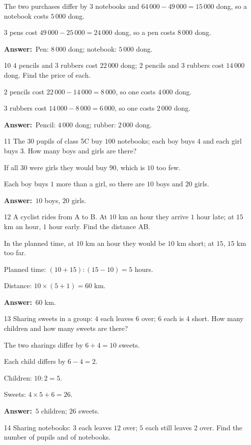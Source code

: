 \documentclass[11pt]{article}
\newif\ifsol \solfalse
\providecommand{\AnsWord}{Đáp số}
\newcommand{\dapso}[1]{\par\textbf{\AnsWord:}\ #1}
\newcommand{\probsol}[1]{%
  \begin{lrbox}{\solmeasure}\begin{minipage}{\dimexpr\linewidth-24pt\relax}#1\end{minipage}\end{lrbox}%
  \ifsol
    \begin{solbox}#1\end{solbox}%
  \else
    \setlength{\solht}{\dimexpr\ht\solmeasure+\dp\solmeasure+0.85cm\relax}%
    \ifdim\solht<1.35cm\setlength{\solht}{1.35cm}\fi
    \begin{tcolorbox}[colback=white,colframe=Line,boxrule=0.8pt,arc=5pt,
      left=8pt,right=8pt,top=4pt,bottom=4pt,height=\solht]{\footnotesize\color{Slate}\itshape\WorkWord}\end{tcolorbox}%
  \fi}
\newcommand{\gap}{\vspace{0.3cm}}
\def\WorkWord{Your work:}
\def\AnsWord{Answer}
\begin{document}
\probsol{
The two purchases differ by $3$ notebooks and $64\,000-49\,000=15\,000$ dong, so a notebook costs $5\,000$ dong.\par
$3$ pens cost $49\,000-25\,000=24\,000$ dong, so a pen costs $8\,000$ dong.
\dapso{Pen: $8\,000$ dong; notebook: $5\,000$ dong.}}
\gap
\begin{probbox}{10}{\relax}
$4$ pencils and $3$ rubbers cost $22\,000$ dong; $2$ pencils and $3$ rubbers cost $14\,000$ dong. Find the price of each.
\end{probbox}
\probsol{
$2$ pencils cost $22\,000-14\,000=8\,000$, so one costs $4\,000$ dong.\par $3$ rubbers cost $14\,000-8\,000=6\,000$, so one costs $2\,000$ dong.
\dapso{Pencil: $4\,000$ dong; rubber: $2\,000$ dong.}}
\gap
\begin{probbox}{11}{\relax}
The $30$ pupils of class 5C buy $100$ notebooks; each boy buys $4$ and each girl buys $3$. How many boys and girls are there?
\end{probbox}
\probsol{
If all $30$ were girls they would buy $90$, which is $10$ too few.\par Each boy buys $1$ more than a girl, so there are $10$ boys and $20$ girls.
\dapso{$10$ boys, $20$ girls.}}
\gap
\begin{probbox}{12}{\relax}
A cyclist rides from A to B. At $10$ km an hour they arrive $1$ hour late; at $15$ km an hour, $1$ hour early. Find the distance AB.
\end{probbox}
\probsol{
In the planned time, at $10$ km an hour they would be $10$ km short; at $15$, $15$ km too far.\par Planned time: $(10+15):(15-10)=5$ hours.\par
Distance: $10\times(5+1)=60$ km.
\dapso{$60$ km.}}
\gap
\begin{probbox}{13}{\relax}
Sharing sweets in a group: $4$ each leaves $6$ over; $6$ each is $4$ short. How many children and how many sweets are there?
\end{probbox}
\probsol{
The two sharings differ by $6+4=10$ sweets.\par Each child differs by $6-4=2$.\par Children: $10:2=5$.\par Sweets: $4\times5+6=26$.
\dapso{$5$ children; $26$ sweets.}}
\gap
\begin{probbox}{14}{\relax}
Sharing notebooks: $3$ each leaves $12$ over; $5$ each still leaves $2$ over. Find the number of pupils and of notebooks.
\end{probbox}
\end{document}
